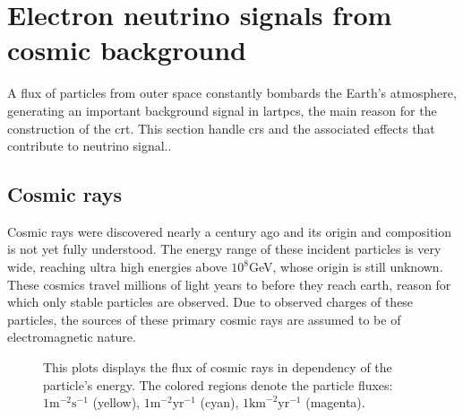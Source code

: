 \section{Electron neutrino signals from cosmic background}
A flux of particles from outer space constantly bombards the Earth's atmosphere, generating an important background signal in \glspl{lartpc}, the main reason for the construction of the \gls{crt}.
This section handle \glspl{cr} and the associated effects that contribute to neutrino signal..
\label{sec:cosmics}

\subsection{Cosmic rays}
Cosmic rays were discovered nearly a century ago and its origin and composition is not yet fully understood.
The energy range of these incident particles is very wide, reaching ultra high energies above $10^{8}$GeV, whose origin is still unknown\cite[-8em]{Dova:2016ipa}.
These cosmics travel millions of light years to before they reach earth, reason for which only stable particles are observed.
Due to observed charges of these particles, the sources of these primary cosmic rays are assumed to be of electromagnetic nature.

\begin{figure}
  \centering
  \caption{%
    This plots displays the flux of cosmic rays in dependency of the particle's energy.
    The colored regions denote the particle fluxes:
    $1 \text{m}^{-2}\text{s}^{-1}$ (yellow),
    $1 \text{m}^{-2}\text{yr}^{-1}$ (cyan),
    $1 \text{km}^{-2}\text{yr}^{-1}$ (magenta).
  }
  \label{fig:cosmics}
\end{figure}

